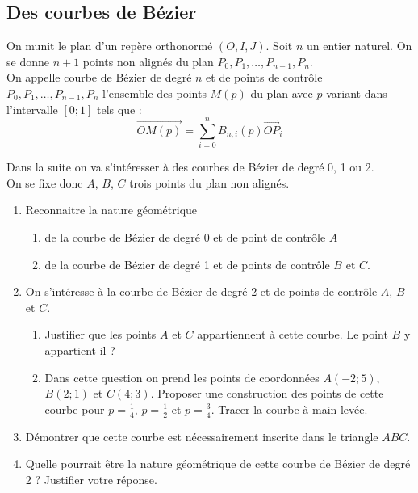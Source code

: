 \documentclass[landscape,twocolumn,leqno,a4paper,10pt]{report} %
\newcommand\n{\noindent}
\begin{document}
\newpage

\subsection{Des courbes de Bézier}

\n On munit le plan d'un repère orthonormé $(O, I, J)$. Soit $n$ un entier naturel. On se donne $n+1$ points non alignés du plan $P_{0}, P_{1}, \ldots, P_{n-1}, P_{n}$.\\
On appelle courbe de Bézier de degré $n$ et de points de contrôle $P_{0}, P_{1}, \ldots, P_{n-1}, P_{n}$ l'ensemble des points $M(p)$ du plan avec $p$ variant dans l'intervalle $[0 ; 1]$ tels que :
$$\overrightarrow{O M(p)}=\sum_{i=0}^{n} B_{n, i}(p) \overrightarrow{O P}_{i}$$

\n Dans la suite on va s'intéresser à des courbes de Bézier de degré 0, 1 ou 2.\\
On se fixe donc $A$, $B$, $C$ trois points du plan non alignés.

\begin{enumerate}
	\item Reconnaitre la nature géométrique 
	\begin{enumerate}
		\item de la courbe de Bézier de degré 0 et de point de contrôle $A$
		\item de la courbe de Bézier de degré 1 et de points de contrôle $B$ et $C$.
	\end{enumerate}
	\item On s'intéresse à la courbe de Bézier de degré 2 et de points de contrôle $A$, $B$ et $C$.
	\begin{enumerate}
		\item Justifier que les points $A$ et $C$ appartiennent à cette courbe. Le point $B$ y appartient-il ?
		\item Dans cette question on prend les points de coordonnées $A(-2 ; 5)$, $B(2 ; 1)$ et $C(4 ; 3)$. Proposer une construction des points de cette courbe pour $p=\frac{1}{4}$, $p=\frac{1}{2}$ et $p=\frac{3}{4}$. Tracer la courbe à main levée.
	\end{enumerate}
	\item Démontrer que cette courbe est nécessairement inscrite dans le triangle $A B C$.
	\item Quelle pourrait être la nature géométrique de cette courbe de Bézier de degré 2 ? Justifier votre réponse.
\end{enumerate}
 
\end{document}

